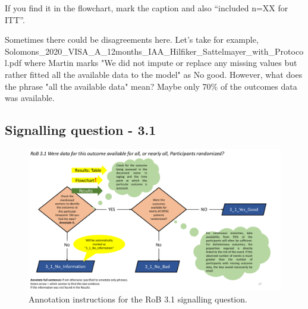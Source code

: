 \documentclass[sn-mathphys,Numbered]{sn-jnl}%
\begin{document}
If you find it in the flowchart, mark the caption and also ``included n=XX for ITT''. %

Sometimes there could be disagreements here. Let's take for example, Solomons\_2020\_VISA\_A\_12months\_IAA\_Hilfiker\_Sattelmayer\_with\_Protocol.pdf where Martin marks "We did not impute or replace any missing values but rather fitted all the available data to the model" as No good. 
However, what does the phrase "all the available data" mean? Maybe only 70\% of the outcomes data was available.
%
%
%
\subsection*{Signalling question - 3.1 }
%
\begin{figure}[hbt]
    \centering
    \includegraphics[width=\textwidth]{figures/3_1.pdf}
    \caption{Annotation instructions for the RoB 3.1 signalling question.}
    \label{fig:3_1}
\end{figure}

%
%
%
\end{document}
